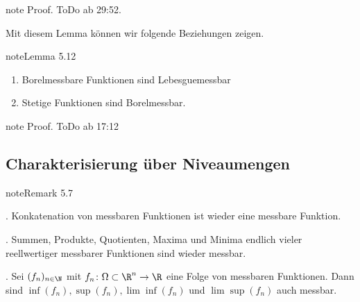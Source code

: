 \documentclass[letterpaper,10pt,english]{jupyterBook}
\begin{document}
\begin{sphinxadmonition}{note}
\sphinxAtStartPar
Proof. ToDo
 ab 29:52.
\end{sphinxadmonition}

\sphinxAtStartPar
Mit diesem Lemma können wir folgende Beziehungen zeigen.
\label{masstheorie/lebesgue_integral:lemma-2}
\begin{sphinxadmonition}{note}{Lemma 5.12}


\begin{enumerate}
%
\item {} 
\sphinxAtStartPar
Borel\sphinxhyphen{}messbare Funktionen sind Lebesgue\sphinxhyphen{}messbar

\item {} 
\sphinxAtStartPar
Stetige Funktionen sind Borel\sphinxhyphen{}messbar.

\end{enumerate}
\end{sphinxadmonition}

\begin{sphinxadmonition}{note}
\sphinxAtStartPar
Proof. ToDo
 ab 17:12
\end{sphinxadmonition}


\subsection{Charakterisierung über Niveaumengen}
\label{\detokenize{masstheorie/lebesgue_integral:charakterisierung-uber-niveaumengen}}\label{masstheorie/lebesgue_integral:remark-3}
\begin{sphinxadmonition}{note}{Remark 5.7}



. Konkatenation von messbaren Funktionen ist wieder eine messbare Funktion.

. Summen, Produkte, Quotienten, Maxima und Minima endlich vieler reellwertiger messbarer Funktionen sind wieder messbar.

. Sei \((f_n)_{n \in \N}\) mit \(f_n \colon \Omega \subset \R^n \rightarrow \R\) eine Folge von messbaren Funktionen.
Dann sind \(\inf(f_n), \sup(f_n), \lim\inf (f_n)\) und \(\lim\sup (f_n)\) auch messbar.
\end{sphinxadmonition}
\end{document}
